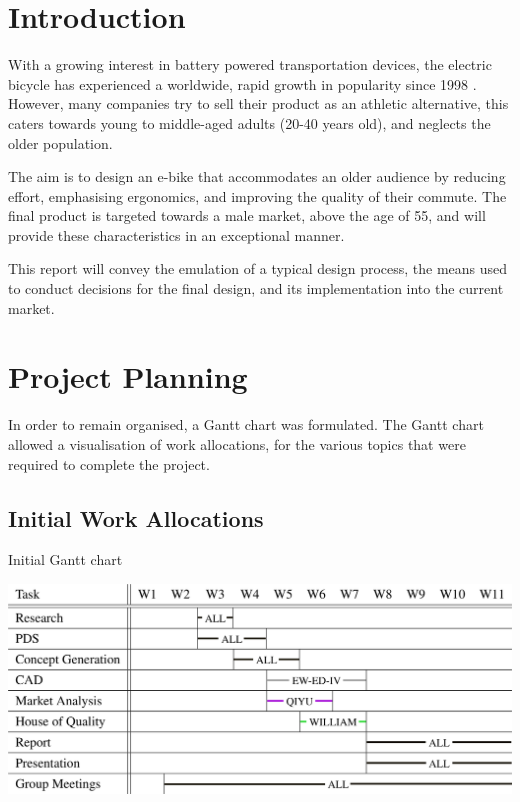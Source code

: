\documentclass[a4paper,11pt]{article}
\begin{document}
\pagebreak

\begingroup
\tableofcontents
\endgroup

\pagebreak

\listoftables
{}

\pagebreak

\listoffigures
{}

\pagebreak


\section{Introduction}

With a growing interest in battery powered transportation devices, the electric bicycle has experienced a worldwide, rapid growth in popularity since 1998 \cite{wein07}. However, many companies try to sell their product as an athletic alternative, this caters towards young to middle-aged adults (20-40 years old), and neglects the older population. 

The aim is to design an e-bike that accommodates an older audience by reducing effort, emphasising ergonomics, and improving the quality of their commute. The final product is targeted towards a male market, above the age of 55, and will provide these characteristics in an exceptional manner.

This report will convey the emulation of a typical design process, the means used to conduct decisions for the final design, and its implementation into the current market.

\section{Project Planning}

In order to remain organised, a Gantt chart was formulated. The Gantt chart allowed a visualisation of work allocations, for the various topics that were required to complete the project. 

\subsection{Initial Work Allocations}

\begin{table}[!ht]
	\centering
	\caption{Initial Gantt chart}
	\includegraphics[width=1\textwidth]{gti}
\end{table}
\end{document}
